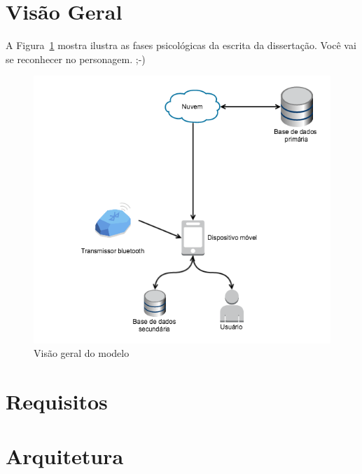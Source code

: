 \documentclass[english,brazilian]{UNISINOSmonografia}
\begin{document}
	\section{Visão Geral}

A Figura~\ref{fig:blablabla} mostra ilustra as fases psicológicas da escrita da dissertação. Você vai se reconhecer no personagem. ;-)

\FloatBarrier
\begin{figure}[!ht]
	\caption{Visão geral do modelo}
	\label{fig:blablabla}
	\centering%
	\begin{minipage}{.8\textwidth}
		\includegraphics[width=\textwidth]{escrita}
	\end{minipage}
\end{figure}
\FloatBarrier

	\section{Requisitos}

	\section{Arquitetura}
 
\end{document}

